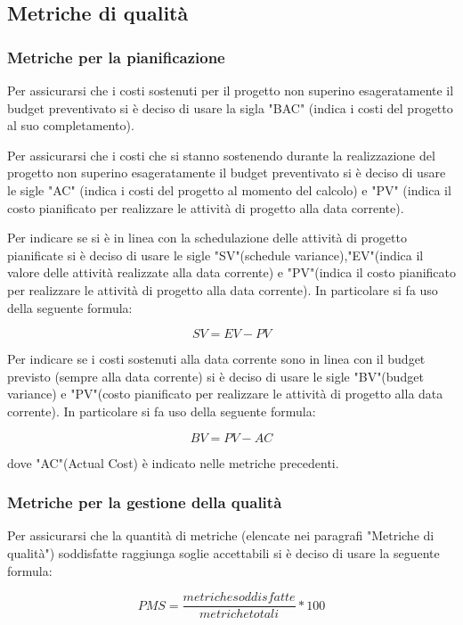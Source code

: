 \subsection{Metriche di qualità}
\subsubsection{Metriche per la pianificazione}
Per assicurarsi che i costi sostenuti per il progetto non superino esageratamente il budget preventivato si è deciso di usare la sigla "BAC" (indica i costi del progetto al suo completamento).

Per assicurarsi che i costi che si stanno sostenendo durante la realizzazione del progetto non superino esageratamente il budget preventivato si è deciso di usare le sigle "AC" (indica i costi del progetto al momento del calcolo) e "PV" (indica il costo pianificato per realizzare le attività di progetto alla data corrente).


Per indicare se si è in linea con la schedulazione delle attività di progetto pianificate si è deciso di usare le sigle "SV"(schedule variance),"EV"(indica il valore delle attività realizzate alla data corrente) e "PV"(indica il costo pianificato per realizzare le attività di progetto alla data corrente). In particolare si fa uso della seguente formula:
\begin{center}
\[SV=EV-PV\]
\end{center}

Per indicare se i costi sostenuti alla data corrente sono in linea con il budget previsto (sempre alla data corrente) si è deciso di usare le sigle "BV"(budget variance) e "PV"(costo pianificato per realizzare le attività di progetto alla data corrente).  In particolare si fa uso della seguente formula:
\begin{center}
\[BV=PV-AC\]
\end{center}
dove "AC"(Actual Cost) è indicato nelle metriche precedenti.

\subsubsection{Metriche per la gestione della qualità}
Per assicurarsi che la quantità di metriche (elencate nei paragrafi "Metriche di qualità")  soddisfatte raggiunga soglie accettabili si è deciso di usare la seguente formula:
\begin{center}
\[PMS=\frac{metriche soddisfatte}{metriche totali}*100\]
\end{center}

